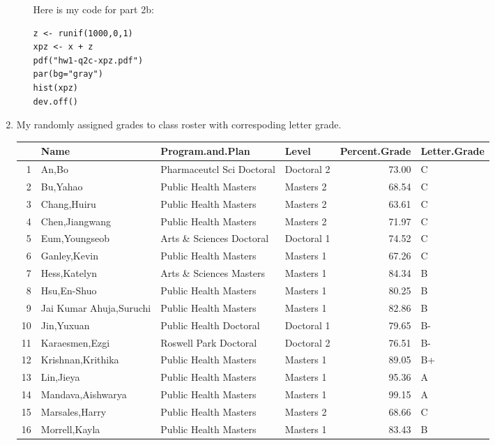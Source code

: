 \documentclass[letterpaper]{article}
\begin{document}
\begin{enumerate}
\begin{enumerate}
Here is my code for part 2b:
\begin{verbatim}
z <- runif(1000,0,1)
xpz <- x + z
pdf("hw1-q2c-xpz.pdf")
par(bg="gray")
hist(xpz)
dev.off()
\end{verbatim}

\end{enumerate} 

\item My randomly assigned grades to class roster with correspoding letter grade.

\begin{table}[ht]
\centering
\begin{tabular}{rlllrl}
  \hline
 & Name & Program.and.Plan & Level & Percent.Grade & Letter.Grade \\ 
  \hline
1 & An,Bo & Pharmaceutcl Sci Doctoral  & Doctoral 2 & 73.00 & C \\ 
  2 & Bu,Yahao & Public Health Masters  & Masters 2 & 68.54 & C \\ 
  3 & Chang,Huiru & Public Health Masters  & Masters 2 & 63.61 & C \\ 
  4 & Chen,Jiangwang & Public Health Masters  & Masters 2 & 71.97 & C \\ 
  5 & Eum,Youngseob & Arts \& Sciences Doctoral  & Doctoral 1 & 74.52 & C \\ 
  6 & Ganley,Kevin & Public Health Masters  & Masters 1 & 67.26 & C \\ 
  7 & Hess,Katelyn & Arts \& Sciences Masters  & Masters 1 & 84.34 & B \\ 
  8 & Hsu,En-Shuo & Public Health Masters  & Masters 1 & 80.25 & B \\ 
  9 & Jai Kumar Ahuja,Suruchi & Public Health Masters  & Masters 1 & 82.86 & B \\ 
  10 & Jin,Yuxuan & Public Health Doctoral  & Doctoral 1 & 79.65 & B- \\ 
  11 & Karaesmen,Ezgi & Roswell Park Doctoral  & Doctoral 2 & 76.51 & B- \\ 
  12 & Krishnan,Krithika & Public Health Masters  & Masters 1 & 89.05 & B+ \\ 
  13 & Lin,Jieya & Public Health Masters  & Masters 1 & 95.36 & A \\ 
  14 & Mandava,Aishwarya & Public Health Masters  & Masters 1 & 99.15 & A \\ 
  15 & Marsales,Harry & Public Health Masters  & Masters 2 & 68.66 & C \\ 
  16 & Morrell,Kayla & Public Health Masters  & Masters 1 & 83.43 & B \\ 

\end{tabular}
\end{table}
\end{enumerate}
\end{document}
